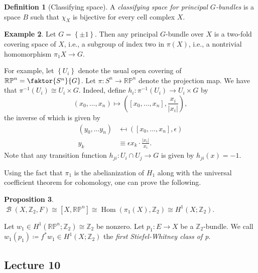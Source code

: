 \documentclass[10pt,letterpaper,cm]{nupset}
\theoremstyle{definition}
\newtheorem{defn}{Definition}[subsection]
\newtheorem{exmp}[defn]{Example}
\theoremstyle{theorem}
\newtheorem{prop}[defn]{Proposition}
\theoremstyle{remark}
\newcommand{\RP}{\mathbb{RP}}
\newcommand{\Z}{\mathbb Z}
\newcommand{\1}{\mathbb{1}}
\newcommand{\0}{\vec 0}
\DeclareMathOperator{\Hom}{Hom}
\DeclareMathOperator{\B}{\mathcal{B}}
\begin{document}
\begin{defn}[Classifying space]
  A \textit{classifying space for principal $G$-bundles} is a space $B$ such that $\chi_X$ is bijective for every cell complex $X$.
\end{defn}

\begin{exmp}
Let $G = \left\{\pm 1\right\}$.  Then any principal $G$-bundle over $X$ is a two-fold covering space of $X$, i.e., a subgroup of index two in $\pi\left(X\right)$, i.e., a nontrivial homomorphism $\pi_1{X} \to G$.

\smallskip

 For example, let $\left\{U_i\right\}$ denote the usual open covering of $\RP^n = \faktor{S^n}{G}$. Let $\pi : S^n \to \RP^n$ denote the projection map. We have that $\pi^{-1} \left(U_i\right) \cong U_i \times G$. Indeed,  define $h_i : \pi^{-1} \left(U_i\right) \to  U_i \times G$ by $$\left(x_0, \ldots, x_n\right) \mapsto \left(\left[x_0, \ldots, x_n\right], \frac{x_i}{\left\lvert{x_i}\right\rvert}\right),$$ the inverse of which is  given by 
 \begin{align*}
 \left(y_0, \ldots y_n\right) & \mapsfrom \left(\left[x_0, \ldots, x_n\right], \epsilon \right) 
 \\ y_k & \equiv \epsilon x_k\cdot \frac{\left\lvert{x_i}\right\rvert}{x_i}.
 \end{align*}
 Note that any transition function $h_{ji} : U_i \cap U_j \to G$ is given by $h_{ji}(x) = {-1}$.
\end{exmp}

Using the fact that $\pi_1$ is the abelianization of $H_1$ along with the universal coefficient theorem for cohomology, one can prove the following.

\begin{prop}
$\B\left(X, \Z_2, F \right) \cong \left[X, \RP^n\right] \cong \Hom\left(\pi_1\left(X\right), \Z_2\right) \cong H^1\left(X; \Z_2\right)$. 
\end{prop}

Let $w_1 \in H^1\left(\RP^n; \Z_2\right) \cong \Z_2$ be nonzero. Let $p_1 : E \to X$ be a $\Z_2$-bundle. We call $w_1\left(p_1\right) \coloneqq f^{\ast}{w_1} \in H^1\left(X; \Z_2\right)$ the \textit{first Stiefel-Whitney class of p}. 

\subsection{Lecture 10}
\end{document}
